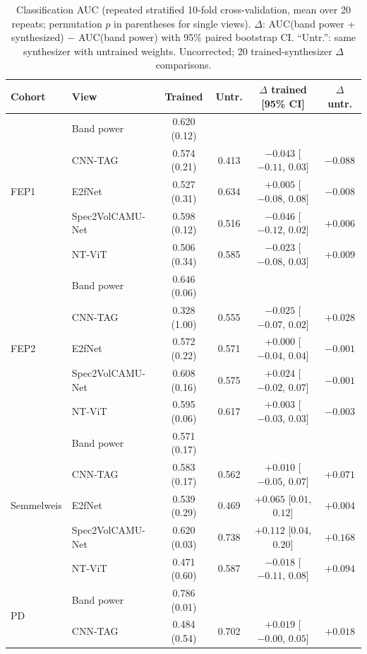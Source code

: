 \documentclass[11pt]{article}
\begin{document}
\begin{table}[t]
\centering
\caption{Classification AUC (repeated stratified 10-fold cross-validation, mean over 20 repeats; permutation $p$ in parentheses for single views). $\Delta$: AUC(band power + synthesized) $-$ AUC(band power) with 95\% paired bootstrap CI. ``Untr.'': same synthesizer with untrained weights. Uncorrected; 20 trained-synthesizer $\Delta$ comparisons.}
\label{tab:clf}
\small
\begin{tabular}{llcccc}
\toprule
Cohort & View & Trained & Untr. & $\Delta$ trained [95\% CI] & $\Delta$ untr. \\
\midrule
\multirow{5}{*}{FEP1} & Band power & 0.620 (0.12) & & & \\
 & CNN-TAG & 0.574 (0.21) & 0.413 & $-0.043$ [$-0.11$, $0.03$] & $-0.088$ \\
 & E2fNet & 0.527 (0.31) & 0.634 & $+0.005$ [$-0.08$, $0.08$] & $-0.008$ \\
 & Spec2VolCAMU-Net & 0.598 (0.12) & 0.516 & $-0.046$ [$-0.12$, $0.02$] & $+0.006$ \\
 & NT-ViT & 0.506 (0.34) & 0.585 & $-0.023$ [$-0.08$, $0.03$] & $+0.009$ \\
\midrule
\multirow{5}{*}{FEP2} & Band power & 0.646 (0.06) & & & \\
 & CNN-TAG & 0.328 (1.00) & 0.555 & $-0.025$ [$-0.07$, $0.02$] & $+0.028$ \\
 & E2fNet & 0.572 (0.22) & 0.571 & $+0.000$ [$-0.04$, $0.04$] & $-0.001$ \\
 & Spec2VolCAMU-Net & 0.608 (0.16) & 0.575 & $+0.024$ [$-0.02$, $0.07$] & $-0.001$ \\
 & NT-ViT & 0.595 (0.06) & 0.617 & $+0.003$ [$-0.03$, $0.03$] & $-0.003$ \\
\midrule
\multirow{5}{*}{Semmelweis} & Band power & 0.571 (0.17) & & & \\
 & CNN-TAG & 0.583 (0.17) & 0.562 & $+0.010$ [$-0.05$, $0.07$] & $+0.071$ \\
 & E2fNet & 0.539 (0.29) & 0.469 & $+0.065$ [$0.01$, $0.12$] & $+0.004$ \\
 & Spec2VolCAMU-Net & 0.620 (0.03) & 0.738 & $+0.112$ [$0.04$, $0.20$] & $+0.168$ \\
 & NT-ViT & 0.471 (0.60) & 0.587 & $-0.018$ [$-0.11$, $0.08$] & $+0.094$ \\
\midrule
\multirow{5}{*}{PD} & Band power & 0.786 (0.01) & & & \\
 & CNN-TAG & 0.484 (0.54) & 0.702 & $+0.019$ [$-0.00$, $0.05$] & $+0.018$ \\

\end{tabular}
\end{table}
\end{document}
